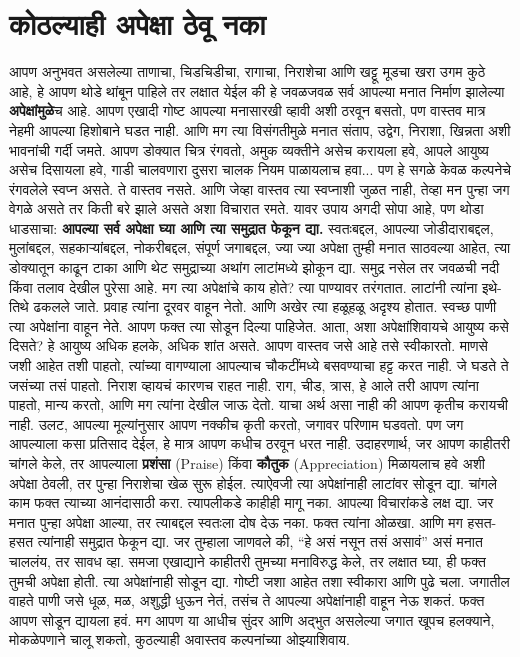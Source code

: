  \chapter{कोठल्याही अपेक्षा ठेवू नका}
आपण अनुभवत असलेल्या ताणाचा, चिडचिडीचा, रागाचा, निराशेचा आणि खट्टू मूडचा खरा उगम कुठे आहे, हे आपण थोडे थांबून पाहिले तर लक्षात येईल की हे जवळजवळ सर्व आपल्या मनात निर्माण झालेल्या \textbf{अपेक्षांमुळे}च आहे. आपण एखादी गोष्ट आपल्या मनासारखी व्हावी अशी ठरवून बसतो, पण वास्तव मात्र नेहमी आपल्या हिशोबाने घडत नाही. आणि मग त्या विसंगतीमुळे मनात संताप, उद्वेग, निराशा, खिन्नता अशी भावनांची गर्दी जमते.
आपण डोक्यात चित्र रंगवतो,  अमुक व्यक्तीने असेच करायला हवे, आपले आयुष्य असेच दिसायला हवे, गाडी चालवणारा दुसरा चालक नियम पाळायलाच हवा... पण हे सगळे केवळ कल्पनेचे रंगवलेले स्वप्न असते. ते वास्तव नसते. आणि जेव्हा वास्तव त्या स्वप्नाशी जुळत नाही, तेव्हा मन पुन्हा जग वेगळे असते तर किती बरे झाले असते अशा विचारात रमते.
यावर उपाय अगदी सोपा आहे, पण थोडा धाडसाचा:
 \textbf{आपल्या सर्व अपेक्षा घ्या आणि त्या समुद्रात फेकून द्या.}
स्वतःबद्दल, आपल्या जोडीदाराबद्दल, मुलांबद्दल, सहकाऱ्यांबद्दल, नोकरीबद्दल, संपूर्ण जगाबद्दल, ज्या ज्या अपेक्षा तुम्ही मनात साठवल्या आहेत, त्या डोक्यातून काढून टाका आणि थेट समुद्राच्या अथांग लाटांमध्ये झोकून द्या. समुद्र नसेल तर जवळची नदी किंवा तलाव देखील पुरेसा आहे.
मग त्या अपेक्षांचे काय होते? त्या पाण्यावर तरंगतात. लाटांनी त्यांना इथे-तिथे ढकलले जाते. प्रवाह त्यांना दूरवर वाहून नेतो. आणि अखेर त्या हळूहळू अदृश्य होतात. स्वच्छ पाणी त्या अपेक्षांना वाहून नेते. आपण फक्त त्या सोडून दिल्या पाहिजेत.
आता, अशा अपेक्षांशिवायचे आयुष्य कसे दिसते? हे आयुष्य अधिक हलके, अधिक शांत असते. आपण वास्तव जसे आहे तसे स्वीकारतो. माणसे जशी आहेत तशी पाहतो, त्यांच्या वागण्याला आपल्याच चौकटींमध्ये बसवण्याचा हट्ट करत नाही. जे घडते ते जसंच्या तसं पाहतो. निराश व्हायचं कारणच राहत नाही. राग, चीड, त्रास, हे आले तरी आपण त्यांना पाहतो, मान्य करतो, आणि मग त्यांना देखील जाऊ देतो.
याचा अर्थ असा नाही की आपण कृतीच करायची नाही. उलट, आपल्या मूल्यांनुसार आपण नक्कीच कृती करतो, जगावर परिणाम घडवतो. पण जग आपल्याला कसा प्रतिसाद देईल, हे मात्र आपण कधीच ठरवून धरत नाही.
उदाहरणार्थ, जर आपण काहीतरी चांगले केले, तर आपल्याला \textbf{प्रशंसा} (Praise) किंवा \textbf{कौतुक} (Appreciation) मिळायलाच हवे अशी अपेक्षा ठेवली, तर पुन्हा निराशेचा खेळ सुरू होईल. त्याऐवजी त्या अपेक्षांनाही लाटांवर सोडून द्या. चांगले काम फक्त त्याच्या आनंदासाठी करा. त्यापलीकडे काहीही मागू नका.
आपल्या विचारांकडे लक्ष द्या. जर मनात पुन्हा अपेक्षा आल्या, तर त्याबद्दल स्वतःला दोष देऊ नका. फक्त त्यांना ओळखा. आणि मग हसत-हसत त्यांनाही समुद्रात फेकून द्या.
जर तुम्हाला जाणवले की, ``हे असं नसून तसं असावं'' असं मनात चाललंय, तर सावध व्हा. समजा एखाद्याने काहीतरी तुमच्या मनाविरुद्ध केले, तर लक्षात घ्या, ही फक्त तुमची अपेक्षा होती. त्या अपेक्षांनाही सोडून द्या. गोष्टी जशा आहेत तशा स्वीकारा आणि पुढे चला.
जगातील वाहते पाणी जसे धूळ, मळ, अशुद्धी धुऊन नेतं, तसंच ते आपल्या अपेक्षांनाही वाहून नेऊ शकतं. फक्त आपण सोडून द्यायला हवं. मग आपण या आधीच सुंदर आणि अद्भुत असलेल्या जगात खूपच हलक्याने, मोकळेपणाने चालू शकतो,  कुठल्याही अवास्तव कल्पनांच्या ओझ्याशिवाय.


